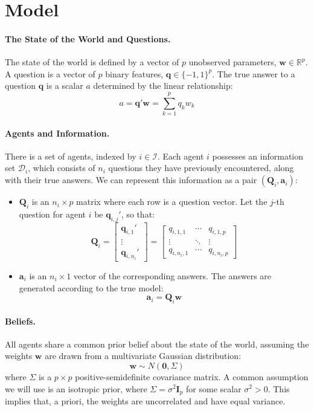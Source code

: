 \documentclass[\ifdraft draft\fi]{article}
\begin{document}
\section{Model}

\paragraph{The State of the World and Questions.} The state of the world is defined by a vector of $p$ unobserved parameters, $\bm{w} \in \mathbb{R}^p$. A question is a vector of $p$ binary features, $\bm{q} \in \{-1, 1\}^p$. The true answer to a question $\bm{q}$ is a scalar $a$ determined by the linear relationship:
\[a = \bm{q}'\bm{w} = \sum_{k=1}^p q_k w_k\]

\paragraph{Agents and Information.} There is a set of agents, indexed by $i \in \mathcal{I}$. Each agent $i$ possesses an information set $\mathcal{D}_i$, which consists of $n_i$ questions they have previously encountered, along with their true answers. We can represent this information as a pair $(\bm{Q}_i, \bm{a}_i)$:

\begin{itemize}
    \item   $\bm{Q}_i$ is an $n_i \times p$ matrix where each row is a question vector. Let the $j$-th question for agent $i$ be $\bm{q}_{i,j}'$, so that:
    \[\bm{Q}_i = \begin{bmatrix} \bm{q}_{i,1}' \\ \vdots \\ \bm{q}_{i,n_i}' \end{bmatrix} = \begin{bmatrix} q_{i,1,1} & \cdots & q_{i,1,p} \\ \vdots & \ddots & \vdots \\ q_{i,n_i,1} & \cdots & q_{i,n_i,p} \end{bmatrix}\]
    \item   $\bm{a}_i$ is an $n_i \times 1$ vector of the corresponding answers. The answers are generated according to the true model:
    \[\bm{a}_i = \bm{Q}_i \bm{w}\]
\end{itemize}

\paragraph{Beliefs.} All agents share a common prior belief about the state of the world, assuming the weights $\bm{w}$ are drawn from a multivariate Gaussian distribution:
\[\bm{w} \sim N(\bm{0}, \Sigma)\]
where $\Sigma$ is a $p \times p$ positive-semidefinite covariance matrix. A common assumption we will use is an isotropic prior, where $\Sigma = \sigma^2 \bm{I}_p$ for some scalar $\sigma^2 > 0$. This implies that, a priori, the weights are uncorrelated and have equal variance.
\end{document}
